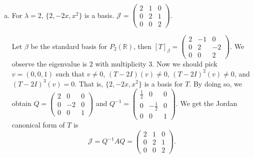 \begin{Exercise}
\begin{enumerate}[(a)]
\item
\begin{answer}
For $\lambda = 2$, $\{2,-2x,x^2\}$ is a basis. $\mathcal{J} = \begin{pmatrix}
2 & 1 & 0 \\
0 & 2 & 1 \\
0 & 0 & 2
\end{pmatrix}$.
\end{answer}
\begin{solution}
Let $\beta$ be the standard basis for $P_2(\mathbb{R})$, then $[T]_{\beta} = \begin{pmatrix}
2 & -1 & 0 \\
0 & 2 & -2 \\
0 & 0 & 2
\end{pmatrix}$. We observe the eigenvalue is $2$ with multiplicity $3$. Now we should pick $v = (0,0,1)$ such that $v\neq 0$, $(T-2I)(v) \neq 0$, $(T-2I)^2(v) \neq 0$, and $(T-2I)^3(v) = 0$. That is, $\{2,-2x,x^2\}$ is a basis for $T$. By doing so, we obtain $Q = \begin{pmatrix}
2 & 0 & 0 \\
0 & -2 & 0 \\
0 & 0 & 1
\end{pmatrix}$ and $Q^{-1} = \begin{pmatrix}
\frac{1}{2} & 0 & 0 \\
0 & -\frac{1}{2} & 0 \\
0 & 0 & 1
\end{pmatrix}$. We get the Jordan canonical form of $T$ is $$
\mathcal{J} = Q^{-1} A Q = \begin{pmatrix}
2 & 1 & 0 \\
0 & 2 & 1 \\
0 & 0 & 2
\end{pmatrix}.
$$
\end{solution}
\end{enumerate}
\end{Exercise}